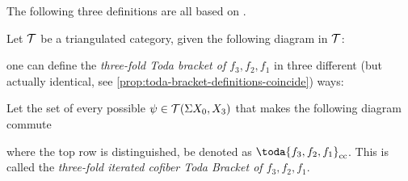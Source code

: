The following three definitions are all based on \cite[Definition 3.1]{Christensen-Frankland_2017}.

Let \( {\mathcal{T}} \) be a triangulated category, given the following diagram in \( {\mathcal{T}} \):
\begin{center}
\end{center}

one can define the \emph{three-fold Toda bracket of \( f_3, f_2, f_1 \)} in three different (but actually identical, see \autoref{prop:toda-bracket-definitions-coincide}) ways:

\begin{definition}
    \label{def:iterated-cofiber-toda-bracket}
    Let the set of every possible \( \psi \in {\mathcal{T}}(\Sigma X_0, X_3) \) that makes the following diagram commute
    \begin{center}
    \end{center}
    where the top row is distinguished, be denoted as \( \toda{f_3, f_2, f_1}_{\cc} \). This is called the \emph{three-fold iterated cofiber Toda Bracket of \( f_3, f_2, f_1 \)}.
\end{definition}

